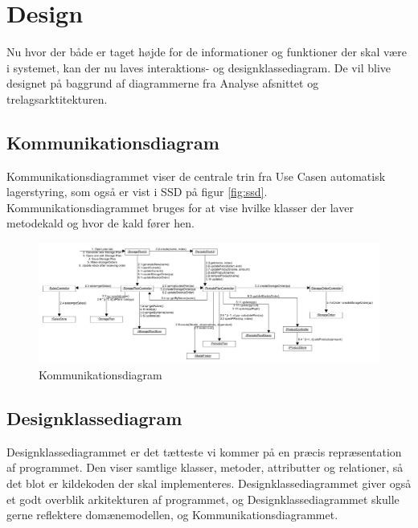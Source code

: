 \chapter{Design}\label{ch:design}
Nu hvor der både er taget højde for de informationer og funktioner der skal være i systemet, kan der nu laves interaktions- og designklassediagram. De vil blive designet på baggrund af diagrammerne fra Analyse afsnittet og trelagsarktitekturen. 

\section{Kommunikationsdiagram}
Kommunikationsdiagrammet viser de centrale trin fra Use Casen automatisk lagerstyring, som også er vist i SSD på figur \ref{fig:ssd}. Kommunikationsdiagrammet bruges for at vise hvilke klasser der laver metodekald og hvor de kald fører hen.

\begin{landscape}
    \begin{figure}[p]
        \centering
        \includegraphics[width=\hsize]{figures/design/Kommunikationsdiagram.png}
        \caption{Kommunikationsdiagram}
        \label{fig:Kommunikationsdiagram}
    \end{figure}
\end{landscape}

\section{Designklassediagram}
Designklassediagrammet er det tætteste vi kommer på en præcis repræsentation af programmet. Den viser samtlige klasser, metoder, attributter og relationer, så det blot er kildekoden der skal implementeres. Designklassediagrammet giver også et godt overblik arkitekturen af programmet, og Designklassediagrammet skulle gerne reflektere domænemodellen, og Kommunikationsdiagrammet.

